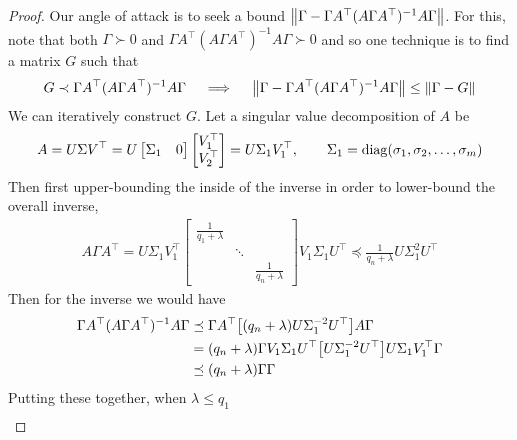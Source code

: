 \documentclass[12pt]{article}
\begin{document}
\begin{proof}
  Our angle of attack is to seek a bound
  \({\left\lVert\Gamma - \Gamma A^\top (A \Gamma A^\top)^{-1} A \Gamma\right\rVert}\).
  For this, note that both
  \(\Gamma \succ 0\)
  and \(\Gamma A^\top (A \Gamma A^\top)^{-1} A \Gamma \succ 0\)
  and so one technique is to find a matrix \(G\) such that
  \begin{align*}
    G \prec \Gamma A^\top (A \Gamma A^\top)^{-1} A \Gamma
      \quad \implies \quad
    {\left\lVert\Gamma - \Gamma A^\top (A \Gamma A^\top)^{-1} A \Gamma\right\rVert}
      \leq {\left\lVert\Gamma - G\right\rVert}
  \end{align*}
  We can iteratively construct \(G\).
  Let a singular value decomposition of \(A\) be
  \begin{align*}
    A = U \Sigma V^\top
      = U \begin{bmatrix} \Sigma_1 & 0 \end{bmatrix}
          \begin{bmatrix} V_1 ^\top \\ V_2 ^\top \end{bmatrix}
      = U \Sigma_1 V_1 ^\top,
      \qquad \Sigma_1 = \operatorname{diag} (\sigma_1, \sigma_2, \ldots, \sigma_m)
  \end{align*}
  Then first upper-bounding the inside of the inverse
  in order to lower-bound the overall inverse,
  \begin{align*}
    A \Gamma A^\top
      = U \Sigma_1 V_1 ^\top
          \begin{bmatrix}
            \frac{1}{q_1 + \lambda} & & \\
            & \ddots & \\
            & & \frac{1}{q_n + \lambda}
          \end{bmatrix}
          V_1 \Sigma_1 U^\top
      \preceq
        \frac{1}{q_n + \lambda} U \Sigma_1 ^2 U^\top
  \end{align*}
  Then for the inverse we would have
  \begin{align*}
    \Gamma A^\top (A \Gamma A^\top)^{-1} A \Gamma
      &\preceq
        \Gamma A^\top {\left[(q_n +\lambda) U\Sigma_1 ^{-2} U^\top\right]}A\Gamma \\
      &= {\left(q_n + \lambda\right)}
          \Gamma V_1 \Sigma_1 U^\top
            {\left[U \Sigma_1 ^{-2} U^\top\right]}
            U \Sigma_1 V_1 ^\top \Gamma \\
      &\preceq {\left(q_n + \lambda\right)} \Gamma \Gamma
  \end{align*}
  Putting these together,
  when \(\lambda \leq q_1\)
  \begin{align*}

\end{align*}
\end{proof}
\end{document}
